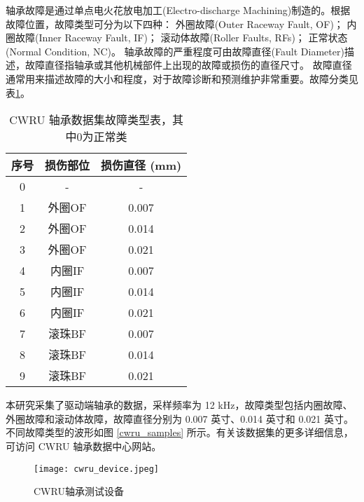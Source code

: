 \documentclass[master]{thesis-uestc}
\begin{document}
轴承故障是通过单点电火花放电加工(Electro-discharge Machining)制造的。根据故障位置，故障类型可分为以下四种：  
外圈故障(Outer Raceway Fault, OF)；  
内圈故障(Inner Raceway Fault, IF)；  
滚动体故障(Roller Faults, RFs)；  
正常状态(Normal Condition, NC)。  
轴承故障的严重程度可由故障直径(Fault Diameter)描述，故障直径指轴承或其他机械部件上出现的故障或损伤的直径尺寸。 故障直径通常用来描述故障的大小和程度，对于故障诊断和预测维护非常重要。故障分类见表\ref{tab:cwru_fault_types}。
\begin{table}[H]
    \centering
    \caption{CWRU 轴承数据集故障类型表，其中0为正常类}
    \renewcommand\arraystretch{1.2}
    \begin{tabular}{ccc}
        \toprule
        序号 & 损伤部位 & 损伤直径 (mm) \\
        \midrule
        0  & - & - \\        
        1  & 外圈OF & 0.007 \\
        2  & 外圈OF & 0.014 \\
        3  & 外圈OF & 0.021 \\
        4  & 内圈IF & 0.007 \\
        5  & 内圈IF & 0.014 \\
        6  & 内圈IF & 0.021 \\
        7  & 滚珠BF & 0.007 \\
        8  & 滚珠BF & 0.014 \\
        9  & 滚珠BF & 0.021 \\
        \bottomrule
    \end{tabular}
    \label{tab:cwru_fault_types}
\end{table}

本研究采集了驱动端轴承的数据，采样频率为 12 kHz，故障类型包括内圈故障、外圈故障和滚动体故障，故障直径分别为 0.007 英寸、0.014 英寸和 0.021 英寸。不同故障类型的波形如图 \ref{cwru_samples} 所示。有关该数据集的更多详细信息，可访问 CWRU 轴承数据中心网站。  

\begin{figure}[h]
    \centering
    \texttt{[image: cwru\_device.jpeg]}
    \caption{CWRU轴承测试设备}
    \label{cwru_device}
\end{figure}
\end{document}
